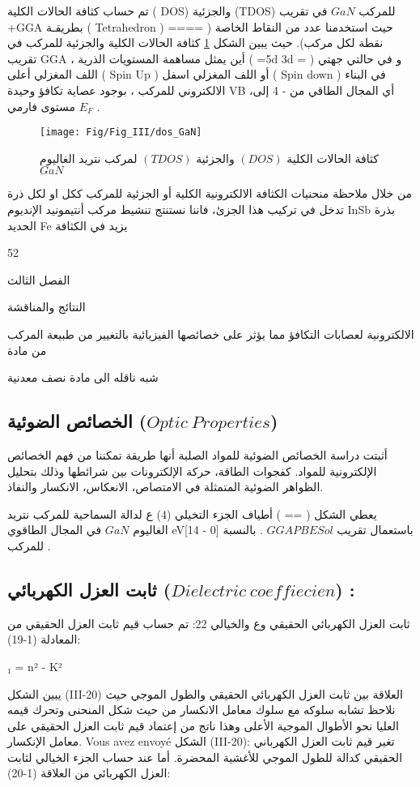 تم حساب كثافة الحالات الكلية ( DOS) والجزئية (TDOS) للمركب $ GaN $  في تقريب +GGA بطريقـة ( Tetrahedron ) حيث استخدمنا عدد من النقاط الخاصة ( ==== نقطة لكل مركب). حيث يبين الشكل \ref{fig:dosgan} كثافة الحالات الكلية والجزئية للمركب في تقريب GGA ، أين يمثل مساهمة المستويات الذرية ( =5d 3d = ) و في حالتي جهتي اللف المغزلي أعلى ( Spin Up ) أو اللف المغزلي اسفل ( Spin down ) في البناء الالكتروني للمركب ، بوجود عصاية تكافؤ وحيدة VB ،أي المجال الطاقي من - 4 إلى مستوى فارمي $ E_{F} $ . 

\begin{figure}[h!]
	\centering
	\texttt{[image: Fig/Fig\_III/dos\_GaN]}
	\caption{ كثافة الحالات الكلية $ ( DOS) $ والجزئية $ (TDOS) $ لمركب نتريد الغاليوم  $ GaN $   }
	\label{fig:dosgan}
\end{figure}
\FloatBarrier
من خلال ملاحظة منحنيات الكثافة الالكترونية الكلية أو الجزئية للمركب ككل او لكل ذرة تدخل في تركيب هذا الجزئ، فاننا نستنتج تنشيط مركب أنتيمونيد الإنديوم InSb بذرة الحديد Fe يزيد في الكثافة

52

الفصل الثالث

النتائج والمناقشة

الالكترونية لعصابات التكافؤ مما يؤثر على خصائصها الفيزيائية بالتغيير من طبيعة المركب من مادة

شبه ناقله الى مادة نصف معدنية
\subsection{ الخصائص الضوئية ($ Optic~Properties $) }

أثبتت دراسة الخصائص الضوئية للمواد الصلبة أنها طريقة تمكننا من فهم الخصائص الإلكترونية للمواد. كفجوات الطاقة، حركة الإلكترونات بين شرائطها وذلك بتحليل الظواهر الضوئية المتمثلة في الامتصاص، الانعكاس، الانكسار والنفاذ.

يعطي الشكل ( == ) أطياف الجزء التخيلي (4) ع لدالة السماحية للمركب نتريد الغاليوم  $ GaN  $  في المجال الطاقوي eV[14 - 0] باستعمال تقريب $ GGAPBESol $ .
بالنسبة للمركب . 

\subsection*{  ثابت العزل الكهربائي  ($ Dielectric~coeffiecien $) :  }

ثابت العزل الكهربائي الحقيقي وع والخيالي 22: تم حساب قيم ثابت العزل الحقيقي من المعادلة (1-19):

₁ = n² - K²

يبين الشكل (III-20) العلاقة بين ثابت العزل الكهربائي الحقيقي والطول الموجي حيث نلاحظ تشابه سلوكه مع سلوك معامل الانكسار من حيث شكل المنحنى وتحرك قيمه العليا نحو الأطوال الموجية الأعلى وهذا ناتج من إعتماد قيم ثابت العزل الحقيقي على معامل الإنكسار.
Vous avez envoyé
الشكل (III-20): تغير قيم ثابت العزل الكهرباني الحقيقي كدالة للطول الموجي للأغشية المحضرة. أما عند حساب الجزء الخيالي لثابت العزل الكهربائي من العلاقة (1-20):

